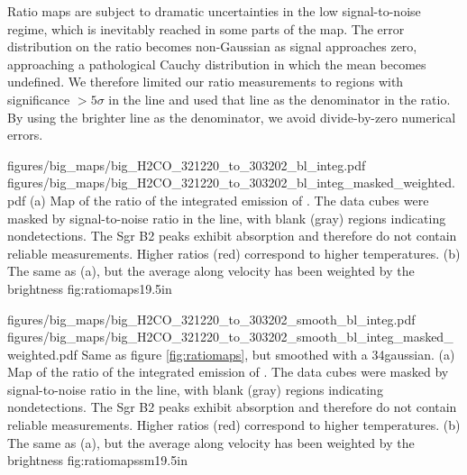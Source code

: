 Ratio maps are subject to dramatic uncertainties in the low signal-to-noise
regime, which is inevitably reached in some parts of the map.  The error
distribution on the ratio becomes non-Gaussian as signal approaches zero,
approaching a pathological Cauchy distribution in which the mean becomes
undefined.
We therefore limited our ratio measurements to regions with significance
$>5\sigma$ in the \threeohthree line and used that line as the denominator
in the ratio.  By using the brighter line as the denominator, we avoid
divide-by-zero numerical errors.


\RotFigureTwoAA
{figures/big_maps/big_H2CO_321220_to_303202_bl_integ.pdf}
{figures/big_maps/big_H2CO_321220_to_303202_bl_integ_masked_weighted.pdf}
{(a) Map of the ratio of the integrated emission of
\Rone.  The data cubes were masked by
signal-to-noise ratio in the \threeohthree line, with blank (gray) regions
indicating nondetections.  The Sgr B2 peaks exhibit \formaldehyde
absorption and therefore do not contain reliable measurements.  Higher ratios
(red) correspond
to higher temperatures.
\newline
(b) The same as (a), but the average along velocity has been
weighted by the \threeohthree brightness
\newline
}
{fig:ratiomaps}{1}{9.5in}

\RotFigureTwoAA
{figures/big_maps/big_H2CO_321220_to_303202_smooth_bl_integ.pdf}
{figures/big_maps/big_H2CO_321220_to_303202_smooth_bl_integ_masked_weighted.pdf}
{Same as figure \ref{fig:ratiomaps}, but smoothed with a 34\arcsec gaussian.
(a) Map of the ratio of the integrated emission of
\Rone.  The data cubes were masked by
signal-to-noise ratio in the \threeohthree line, with blank (gray) regions
indicating nondetections.  The Sgr B2 peaks exhibit \formaldehyde
absorption and therefore do not contain reliable measurements.  Higher ratios
(red) correspond
to higher temperatures.
\newline
(b) The same as (a), but the average along velocity has been
weighted by the \threeohthree brightness
\newline
}
{fig:ratiomapssm}{1}{9.5in}


